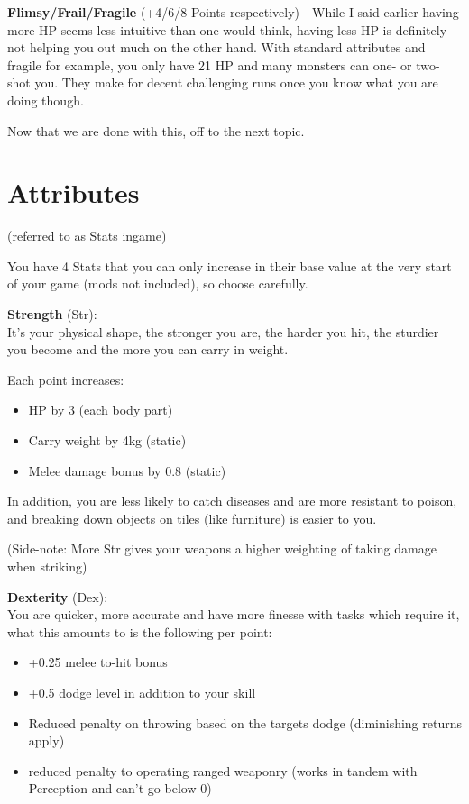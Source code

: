 \documentclass[11pt]{report}
\begin{document}
\textbf{Flimsy/Frail/Fragile} (+4/6/8 Points respectively) - While I said earlier having more HP seems less intuitive than one would think, having less HP is definitely not helping you out much on the other hand. With standard attributes and fragile for example, you only have 21 HP and many monsters can one- or two-shot you. They make for decent challenging runs once you know what you are doing though.

Now that we are done with this, off to the next topic.

\section{Attributes}

(referred to as Stats ingame)

You have 4 Stats that you can only increase in their base value at the very start of your game (mods not included), so choose carefully.

\textbf{Strength} (Str):\\It's your physical shape, the stronger you are, the harder you hit, the sturdier you become and the more you can carry in weight.

Each point increases:
\begin{itemize}
\item HP by 3 (each body part)
\item Carry weight by 4kg (static)
\item Melee damage bonus by 0.8 (static)
\end{itemize}

In addition, you are less likely to catch diseases and are more resistant to poison, and breaking down objects on tiles (like furniture) is easier to you.

(Side-note: More Str gives your weapons a higher weighting of taking damage when striking)

\textbf{Dexterity} (Dex):\\You are quicker, more accurate and have more finesse with tasks which require it, what this amounts to is the following per point:
\begin{itemize}
\item +0.25 melee to-hit bonus
\item +0.5 dodge level in addition to your skill
\item Reduced penalty on throwing based on the targets dodge (diminishing returns apply)
\item reduced penalty to operating ranged weaponry (works in tandem with Perception and can't go below 0)
\end{itemize}
\end{document}
